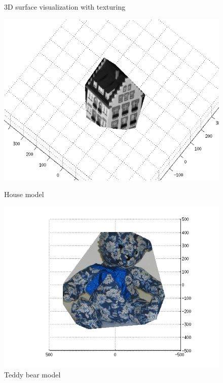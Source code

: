 \documentclass[a4paper,10pt]{article}
\begin{document}
\begin{figure}[ht]
\caption{3D surface visualization with texturing}
\begin{minipage}[b]{0.45\linewidth}
\centering
\includegraphics[width=\textwidth]{textured_house1}
\caption{House model}
\end{minipage}
\hspace{0.5cm}
\begin{minipage}[b]{0.45\linewidth}
\centering
\includegraphics[width=\textwidth]{textured_teddy1}
\caption{Teddy bear model}
\end{minipage}
\label{fig:textured}
\end{figure}
\end{document}
